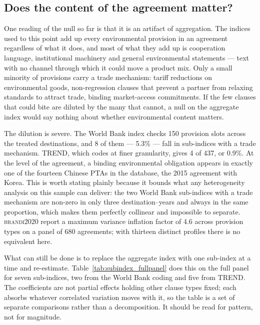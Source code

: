 \documentclass[11pt]{article}
\newcommand{\citet}[1]{\textsc{#1}}
\begin{document}
\FloatBarrier
\subsection{Does the content of the agreement matter?}\label{sec:subindices}

One reading of the null so far is that it is an artifact of aggregation. The indices used to this point
add up every environmental provision in an agreement regardless of what it does, and most of what they
add up is cooperation language, institutional machinery and general environmental statements --- text
with no channel through which it could move a product mix. Only a small minority of provisions carry a
trade mechanism: tariff reductions on environmental goods, non-regression clauses that prevent a
partner from relaxing standards to attract trade, binding market-access commitments. If the few
clauses that could bite are diluted by the many that cannot, a null on the aggregate index would say
nothing about whether environmental content matters.

The dilution is severe. The World Bank index checks 150 provision slots across the treated
destinations, and 8 of them --- 5.3\% --- fall in sub-indices with a trade mechanism. TREND, which
codes at finer granularity, gives 4 of 437, or 0.9\%. At the level of the agreement, a binding
environmental obligation appears in exactly one of the fourteen Chinese PTAs in the database, the 2015
agreement with Korea. This is worth stating plainly because it bounds what any heterogeneity analysis
on this sample can deliver: the two World Bank sub-indices with a trade mechanism are non-zero in only
three destination--years and always in the same proportion, which makes them perfectly collinear and
impossible to separate. \citet{brandi2020} report a maximum variance inflation factor of 4.6 across
provision types on a panel of 680 agreements; with thirteen distinct profiles there is no equivalent
here.

What can still be done is to replace the aggregate index with one sub-index at a time and re-estimate.
Table~\ref{tab:subindex_fullpanel} does this on the full panel for seven sub-indices, two from the
World Bank coding and five from TREND. The coefficients are not partial effects holding other clause
types fixed; each absorbs whatever correlated variation moves with it, so the table is a set of
separate comparisons rather than a decomposition. It should be read for pattern, not for magnitude.
\end{document}
